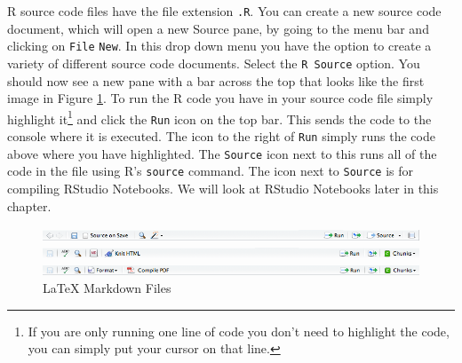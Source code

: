 \documentclass[krantz1]{krantz}
\begin{document}
R source code files have the file extension \texttt{.R}. You can create a new source code document, which will open a new Source pane, by going to the menu bar and clicking on \texttt{File} \textrightarrow \: \texttt{New}. In this drop down menu you have the option to create a variety of different source code documents. Select the \texttt{R Source} option. You should now see a new pane with a bar across the top that looks like the first image in Figure \ref{SourcePanes}. To run the R code you have in your source code file simply highlight it\footnote{If you are only running one line of code you don't need to highlight the code, you can simply put your cursor on that line.} and click the \texttt{Run} icon on the top bar. This sends the code to the console where it is executed. The icon to the right of \texttt{Run} simply runs the code above where you have highlighted. The \texttt{Source} icon next to this runs all of the code in the file using R's \texttt{source} command. The icon next to \texttt{Source} is for compiling RStudio Notebooks. We will look at RStudio Notebooks later in this chapter.

\begin{figure}[ht]
    \caption{RStudio Source Code Pane Top Bars}
    \label{SourcePanes}
    \begin{center}
    
        \begin{subfigure}
            \caption{R Source Code}
            \includegraphics[width = \textwidth]{Children/Chapter3/images3/RSourceBar.png}
        \end{subfigure}
        \vspace{0.5cm}
        
        \begin{subfigure}
            \caption{R Markdown Files}
            \includegraphics[width = \textwidth]{Children/Chapter3/images3/MarkdownSourceBar.png}
        \end{subfigure}
        \vspace{0.5cm}
        
        \begin{subfigure}
            \caption{LaTeX Markdown Files}
            \includegraphics[width = \textwidth]{Children/Chapter3/images3/LaTeXSourceBar.png}
        \end{subfigure}
        
    \end{center}
\end{figure}
\end{document}
